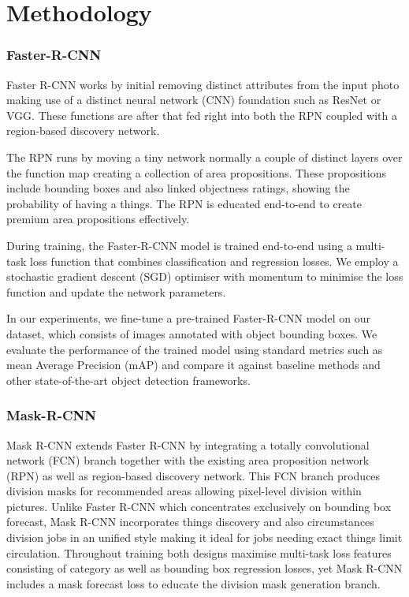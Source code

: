 \documentclass{IEEEtran}
\begin{document}
	\section{Methodology}
	\subsubsection{Faster-R-CNN}
	Faster R-CNN works by initial removing distinct attributes from the input photo making use of a distinct neural network (CNN) foundation such as ResNet or VGG. These functions are after that fed right into both the RPN coupled with a region-based discovery network.
	
	The RPN runs by moving a tiny network normally a couple of distinct layers over the function map creating a collection of area propositions. These propositions include bounding boxes and also linked objectness ratings, showing the probability of having a things. The RPN is educated end-to-end to create premium area propositions effectively.
	
	During training, the Faster-R-CNN model is trained end-to-end using a multi-task loss function that combines classification and regression losses. We employ a stochastic gradient descent (SGD) optimiser with momentum to minimise the loss function and update the network parameters.
	
	In our experiments, we fine-tune a pre-trained Faster-R-CNN model on our dataset, which consists of images annotated with object bounding boxes. We evaluate the performance of the trained model using standard metrics such as mean Average Precision (mAP) and compare it against baseline methods and other state-of-the-art object detection frameworks.
	
	\subsubsection{Mask-R-CNN}
	
	Mask R-CNN extends Faster R-CNN by integrating a totally convolutional network (FCN) branch together with the existing area proposition network (RPN) as well as region-based discovery network. This FCN branch produces division masks for recommended areas allowing pixel-level division within pictures. Unlike Faster R-CNN which concentrates exclusively on bounding box forecast, Mask R-CNN incorporates things discovery and also circumstances division jobs in an unified style making it ideal for jobs needing exact things limit circulation. Throughout training both designs maximise multi-task loss features consisting of category as well as bounding box regression losses, yet Mask R-CNN includes a mask forecast loss to educate the division mask generation branch.
	
\end{document}
